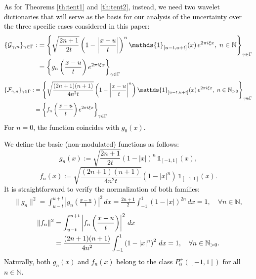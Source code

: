 \documentclass[preprint,hidelinks,authoryear]{elsarticle}
\theoremstyle{plain}
\theoremstyle{definition}
\theoremstyle{remark}
\begin{document}
\textcolor{black}{As for Theorems \ref{th:tent1} and \ref{th:tent2}, instead, we need two wavelet dictionaries that will serve as the basis  for our analysis of the uncertainty over the three specific cases considered in this paper:
\begin{align}
\{\mathcal{G}_{\gamma,n}\}_{\gamma \in \Gamma} :&= \left\{ \sqrt{\frac{2n+1}{2t}} \left(1 - \left| \frac{x - u}{t} \right| \right)^n \mathds{1}_{[u - t, u + t]}(x) \, e^{2\pi i \xi x}, \; n \in \mathbb{N} \right\}_{\gamma \in \Gamma} \notag \\
    &= \left\{ g_n\left( \frac{x - u}{t} \right) e^{2\pi i \xi x} \right\}_{\gamma \in \Gamma}
    \label{dizionario1}    
\end{align}
\begin{align}
\label{dizionario2}
    \{\mathcal{F}_{\gamma,n}\}_{\gamma \in \Gamma} :&= \left\{ \sqrt{\frac{(2n+1)(n+1)}{4n^2 t}} \left(1 - \left| \frac{x - u}{t} \right|^n \right) \mathds{1}_{[u - t, u + t]}(x) \, e^{2\pi i \xi x}, \; n \in \mathbb{N}_{> 0} \right\}_{\gamma \in \Gamma} \notag \\
    &= \left\{ f_n\left( \frac{x - u}{t} \right) e^{2\pi i \xi x} \right\}_{\gamma \in \Gamma}
\end{align}
For $ n = 0 $, the function coincides with $ g_0(x) $.}

\textcolor{black}{We define the basic (non-modulated) functions as follows:
\begin{equation}
    g_n(x) := \sqrt{\frac{2n+1}{2t}} \left(1 - |x| \right)^n \, \mathds{1}_{[-1,1]}(x),
    \label{definizioneunog}
\end{equation}
\begin{equation}
    f_n(x) := \sqrt{\frac{(2n+1)(n+1)}{4n^2 t}} \left(1 - |x|^n \right) \, \mathds{1}_{[-1,1]}(x).
    \label{definizioneduef}
\end{equation}
It is straightforward to verify the normalization of both families:
\begin{align}
    \|g_n\|^2 = \int_{u - t}^{u + t} \left| g_n\left( \frac{x - u}{t} \right) \right|^2 \, dx = \frac{2n+1}{2} \int_{-1}^{1} (1 - |x|)^{2n} \, dx = 1, \quad \forall n \in \mathbb{N},
    \label{norm_gn_eng}
\end{align}
\begin{align}
    \|f_n\|^2 &= \int_{u - t}^{u + t} \left| f_n\left( \frac{x - u}{t} \right) \right|^2 \, dx \notag \\
              &= \frac{(2n+1)(n+1)}{4n^2} \int_{-1}^{1} \left(1 - |x|^n \right)^2 \, dx = 1, \quad \forall n \in \mathbb{N}_{>0}.
    \label{norm_fn_eng}
\end{align}
Naturally, both $ g_n(x) $ and $ f_n(x) $ belong to the class $ P^+_0([-1,1]) $ for all $ n \in \mathbb{N} $.}
\end{document}
